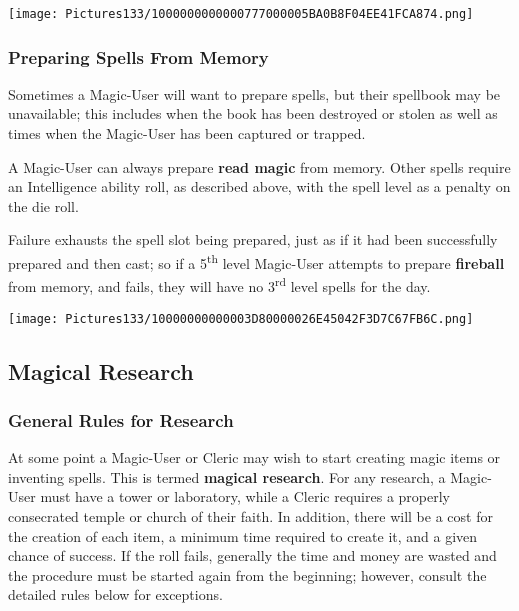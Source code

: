 \documentclass[a4paper,twoside,openany,10pt]{book}
\begin{document}
\begin{multicols}{2}
 \begin{center}
 	\texttt{[image: Pictures133/1000000000000777000005BA0B8F04EE41FCA874.png]} 
 \end{center}

\subsubsection{Preparing Spells From Memory}\label{preparing-spells-from-memory}

Sometimes a Magic-User will want to prepare spells, but their spellbook may be unavailable; this includes when the book has been destroyed or stolen as well as times when the Magic-User has been captured or trapped.

A Magic-User can always prepare \textbf{read magic} from memory. Other spells require an Intelligence ability roll, as described above, with the spell level as a penalty on the die roll.

Failure exhausts the spell slot being prepared, just as if it had been successfully prepared and then cast; so if a 5\textsuperscript{th} level Magic-User attempts to prepare \textbf{fireball} from memory, and fails, they will have no 3\textsuperscript{rd} level spells for the day.

\begin{center}
	\texttt{[image: Pictures133/10000000000003D80000026E45042F3D7C67FB6C.png]}
\end{center}

\subsection{Magical Research}\label{magical-research}

\subsubsection{General Rules for Research}\label{general-rules-for-research}

At some point a Magic-User or Cleric may wish to start creating magic items or inventing spells. This is termed \textbf{magical research}. For any research, a Magic-User must have a tower or laboratory, while a Cleric requires a properly consecrated temple or church of their faith. In addition, there will be a cost for the creation of each item, a minimum time required to create it, and a given chance of success. If the roll fails, generally the time and money are wasted and the procedure must be started again from the beginning; however, consult the detailed rules below for exceptions.


\end{multicols}
\end{document}
